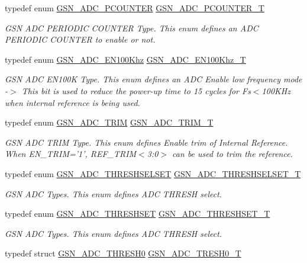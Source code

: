 \begin{DoxyCompactItemize}
typedef enum \hyperlink{a00643_gab6f216973f783f72673e41fefdcd0019}{GSN\_\-ADC\_\-PCOUNTER} \hyperlink{a00643_ga61aa307a5df8fedd147de04bbdb9a36d}{GSN\_\-ADC\_\-PCOUNTER\_\-T}
\begin{DoxyCompactList}\small\item\em GSN ADC PERIODIC COUNTER Type. This enum defines an ADC PERIODIC COUNTER to enable or not. \end{DoxyCompactList}\item 
typedef enum \hyperlink{a00643_ga35058132ca643890ae11c73b8a157dcb}{GSN\_\-ADC\_\-EN100Khz} \hyperlink{a00643_gacdca24ad9324635589139ad12ce67090}{GSN\_\-ADC\_\-EN100Khz\_\-T}
\begin{DoxyCompactList}\small\item\em GSN ADC EN100K Type. This enum defines an ADC Enable low frequency mode -\/$>$ This bit is used to reduce the power-\/up time to 15 cycles for Fs$<$100KHz when internal reference is being used. \end{DoxyCompactList}\item 
typedef enum \hyperlink{a00643_gae2b441d4a96a542d5d290e1454fbaa1d}{GSN\_\-ADC\_\-TRIM} \hyperlink{a00643_gace83cba6b68fe265f09d30cda1ef0e63}{GSN\_\-ADC\_\-TRIM\_\-T}
\begin{DoxyCompactList}\small\item\em GSN ADC TRIM Type. This enum defines Enable trim of Internal Reference. When EN\_\-TRIM='1', REF\_\-TRIM$<$3:0$>$ can be used to trim the reference. \end{DoxyCompactList}\item 
typedef enum \hyperlink{a00643_ga1ce87a8054fcb9ddfc65af6e2ceae738}{GSN\_\-ADC\_\-THRESHSELSET} \hyperlink{a00643_gaaac97c7455490c22d89a3f33ab7355d2}{GSN\_\-ADC\_\-THRESHSELSET\_\-T}
\begin{DoxyCompactList}\small\item\em GSN ADC Types. This enum defines ADC THRESH select. \end{DoxyCompactList}\item 
typedef enum \hyperlink{a00643_ga412edebebb3303e32a1c0c0bcab46d04}{GSN\_\-ADC\_\-THRESHSET} \hyperlink{a00643_ga5a5c60aaf9f413612a6b37d0eb136c48}{GSN\_\-ADC\_\-THRESHSET\_\-T}
\begin{DoxyCompactList}\small\item\em GSN ADC Types. This enum defines ADC THRESH select. \end{DoxyCompactList}\item 
typedef struct \hyperlink{a00026}{GSN\_\-ADC\_\-THRESH0} \hyperlink{a00643_ga67dc995f7880016f896f0fdf6b61309b}{GSN\_\-ADC\_\-TRESH0\_\-T}

\end{DoxyCompactItemize}
